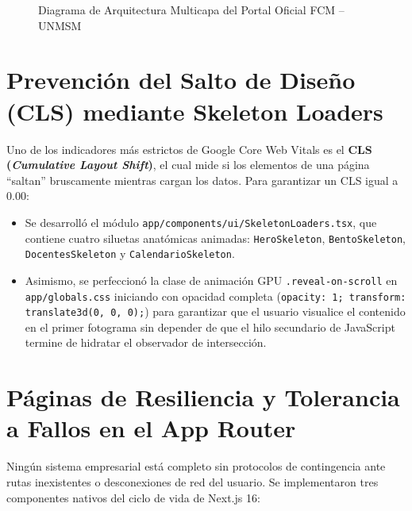 \documentclass[12pt,a4paper,oneside]{report}
\begin{document}
\begin{figure}[htbp]
\vspace{4pt}
\caption{Diagrama de Arquitectura Multicapa del Portal Oficial FCM -- UNMSM}
\label{fig:arquitectura-multicapa}
\end{figure}

\section{Prevención del Salto de Diseño (CLS) mediante Skeleton Loaders}
Uno de los indicadores más estrictos de Google Core Web Vitals es el \textbf{CLS (\textit{Cumulative Layout Shift})}, el cual mide si los elementos de una página ``saltan'' bruscamente mientras cargan los datos. Para garantizar un CLS igual a $0.00$:

\begin{itemize}[leftmargin=1.0cm]
  \item Se desarrolló el módulo \texttt{app/components/ui/SkeletonLoaders.tsx}, que contiene cuatro siluetas anatómicas animadas: \texttt{HeroSkeleton}, \texttt{BentoSkeleton}, \texttt{DocentesSkeleton} y \texttt{CalendarioSkeleton}.
  \item Asimismo, se perfeccionó la clase de animación GPU \texttt{.reveal-on-scroll} en \texttt{app/globals.css} iniciando con opacidad completa (\texttt{opacity: 1; transform: translate3d(0, 0, 0);}) para garantizar que el usuario visualice el contenido en el primer fotograma sin depender de que el hilo secundario de JavaScript termine de hidratar el observador de intersección.
\end{itemize}

\section{Páginas de Resiliencia y Tolerancia a Fallos en el App Router}
Ningún sistema empresarial está completo sin protocolos de contingencia ante rutas inexistentes o desconexiones de red del usuario. Se implementaron tres componentes nativos del ciclo de vida de Next.js 16:
\end{document}
